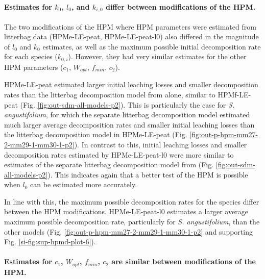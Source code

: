 \documentclass[esd, manuscript]{copernicus}
\begin{document}
\paragraph*{\texorpdfstring{Estimates for \(k_0\), \(l_0\), and \(k_{i,0}\) differ between modifications of the HPM.}{Estimates for k\_0, l\_0, and k\_\{i,0\} differ between modifications of the HPM.}}

The two modifications of the HPM where HPM parameters were estimated from litterbag data (HPMe-LE-peat, HPMe-LE-peat-l0) also differed in the magnitude of \(l_0\) and \(k_0\) estimates, as well as the maximum possible initial decomposition rate for each species (\(k_{0,i}\)). However, they had very similar estimates for the other HPM parameters (\(c_1\), \(W_{opt}\), \(f_{min}\), \(c_2\)).

HPMe-LE-peat estimated larger initial leaching losses and smaller decomposition rates than the litterbag decomposition model from \citet{Teickner.2024f} alone, similar to HPMf-LE-peat (Fig. \ref{fig:out-sdm-all-models-p2}). This is particularly the case for \emph{S. angustifolium}, for which the separate litterbag decomposition model estimated much larger average decomposition rates and smaller initial leaching losses than the litterbag decomposition model in HPMe-LE-peat (Fig. \ref{fig:out-p-hpm-mm27-2-mm29-1-mm30-1-p2}). In contrast to this, initial leaching losses and smaller decomposition rates estimated by HPMe-LE-peat-l0 were more similar to estimates of the separate litterbag decomposition model from \citet{Teickner.2024f} (Fig. \ref{fig:out-sdm-all-models-p2}). This indicates again that a better test of the HPM is possible when \(l_0\) can be estimated more accurately.

In line with this, the maximum possible decomposition rates for the species differ between the HPM modifications. HPMe-LE-peat-l0 estimates a larger average maximum possible decomposition rate, particularly for \emph{S. angustifolium}, than the other models (Fig. \ref{fig:out-p-hpm-mm27-2-mm29-1-mm30-1-p2} and supporting Fig. \ref{si-fig:sup-hpmd-plot-6}).

\paragraph*{\texorpdfstring{Estimates for \(c_1\), \(W_{opt}\), \(f_{min}\), \(c_2\) are similar between modifications of the HPM.}{Estimates for c\_1, W\_\{opt\}, f\_\{min\}, c\_2 are similar between modifications of the HPM.}}
\end{document}
